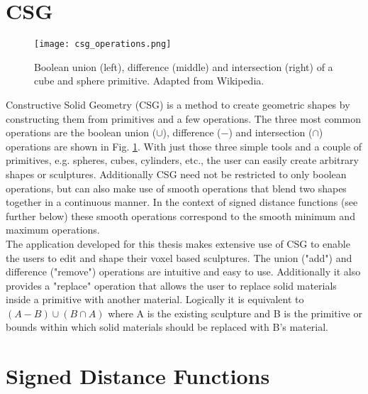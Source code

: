 \section{CSG}

\begin{figure}
\centering
\captionsetup{width=0.4\textwidth}
\texttt{[image: csg\_operations.png]}
\caption{Boolean union (left), difference (middle) and intersection (right) of a cube and sphere primitive. Adapted from Wikipedia\protect\footnotemark.}
\label{fig:csg_operations}
\end{figure}

Constructive Solid Geometry (CSG) is a method to create geometric shapes by constructing them from primitives and a few operations.
The three most common operations are the boolean union ($\cup$), difference ($-$) and intersection ($\cap$) operations are shown in Fig. \ref{fig:csg_operations}. With just
those three simple tools and a couple of primitives, e.g. spheres, cubes, cylinders, etc., the user can easily create arbitrary shapes or sculptures.
Additionally CSG need not be restricted to only boolean operations, but can also make use of smooth operations that blend two shapes together in a continuous
manner. In the context of signed distance functions (see further below) these smooth operations correspond to the smooth minimum and maximum operations.\\
The application developed for this thesis makes extensive use of CSG to enable the users to edit and shape their voxel based sculptures. The union ("add") and
difference ("remove") operations are intuitive and easy to use. Additionally it also provides a "replace" operation that allows the user to replace solid materials inside
a primitive with another material. Logically it is equivalent to $(A-B) \cup (B \cap A)$ where A is the existing sculpture and B is the primitive or bounds within
which solid materials should be replaced with B's material.

\section{Signed Distance Functions}


